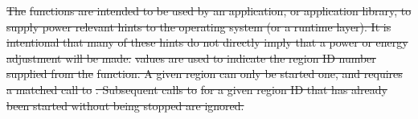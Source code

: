 \documentclass[12pt]{report} %
\providecommand{\DIFdeltex}[1]{{\protect\color{red}\sout{#1}}}                      %
\providecommand{\DIFdelbegin}{} %
\providecommand{\DIFdelend}{} %
\providecommand{\DIFdel}[1]{\texorpdfstring{\DIFdeltex{#1}}{}} %
\newcommand{\DIFscaledelfig}{0.5}
\newlength{\DIFdelgraphicswidth} %
\newlength{\DIFdelgraphicsheight} %
\newcommand{\DIFdelincludegraphics}[2][]{%
\sbox{\DIFdelgraphicsbox}{\DIFOincludegraphics[#1]{#2}}%
\settoboxwidth{\DIFdelgraphicswidth}{\DIFdelgraphicsbox} %
\settoboxtotalheight{\DIFdelgraphicsheight}{\DIFdelgraphicsbox} %
\scalebox{\DIFscaledelfig}{%
\parbox[b]{\DIFdelgraphicswidth}{\usebox{\DIFdelgraphicsbox}\\[-\baselineskip] \rule{\DIFdelgraphicswidth}{0em}}\llap{\resizebox{\DIFdelgraphicswidth}{\DIFdelgraphicsheight}{%
\setlength{\unitlength}{\DIFdelgraphicswidth}%
\begin{picture}(1,1)%
\thicklines\linethickness{2pt} %
{\color[rgb]{1,0,0}\put(0,0){\framebox(1,1){}}}%
{\color[rgb]{1,0,0}\put(0,0){\line( 1,1){1}}}%
{\color[rgb]{1,0,0}\put(0,1){\line(1,-1){1}}}%
\end{picture}%
}\hspace*{3pt}}} %
} %
\DeclareRobustCommand{\DIFdelbegin}{\DIFOdelbegin \let\includegraphics\DIFdelincludegraphics} %
\DeclareRobustCommand{\DIFdelend}{\DIFOaddend \let\includegraphics\DIFOincludegraphics} %
\begin{document}
\DIFdelend %
\DIFdelbegin %


\DIFdel{The }%
\DIFdel{functions are intended to be used by an application, 
or application library, to supply power relevant hints to the operating system (or a runtime layer). 
It is intentional that many of these hints do not directly imply that a power or energy adjustment will be made.
}%
\DIFdel{values are used to indicate the region ID number supplied from the }%
\DIFdel{function.
A given region can only be started one, and requires a matched call to }%
\DIFdel{.
Subsequent calls to }%
\DIFdel{for a given region ID that has already been started without being
stopped are ignored.
}%

\end{document}
